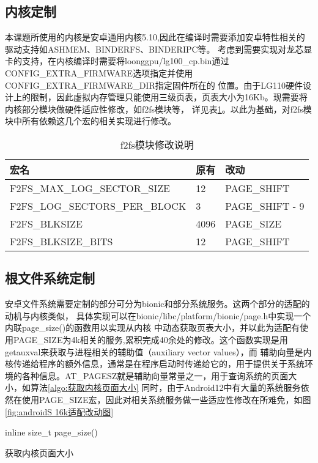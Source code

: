 \subsection{内核定制}
本课题所使用的内核是安卓通用内核5.10,因此在编译时需要添加安卓特性相关的驱动支持如ASHMEM、BINDERFS、BINDERIPC等。
考虑到需要实现对龙芯显卡的支持，在内核编译时需要将loonggpu/lg100\_cp.bin通过CONFIG\_EXTRA\_FIRMWARE选项指定并使用CONFIG\_EXTRA\_FIRMWARE\_DIR指定固件所在的
位置。由于LG110硬件设计上的限制，因此虚拟内存管理只能使用三级页表，页表大小为16Kb。现需要将内核部分模块做硬件适应性修改，如f2fs模块等，
详见表\ref{tab:f2fs模块修改说明}。以此为基础，对f2fs模块中所有依赖这几个宏的相关实现进行修改。

\begin{table}[h]
  \centering
  \caption{f2fs模块修改说明}
  \label{tab:f2fs模块修改说明}
  \begin{tabular}{lll}
    \toprule
    宏名   &   原有  &改动  \\
    \midrule
    F2FS\_MAX\_LOG\_SECTOR\_SIZE & 12 & PAGE\_SHIFT \\
    F2FS\_LOG\_SECTORS\_PER\_BLOCK & 3 & PAGE\_SHIFT - 9 \\
    F2FS\_BLKSIZE & 4096 & PAGE\_SIZE \\
    F2FS\_BLKSIZE\_BITS & 12 & PAGE\_SHIFT \\
    \bottomrule
  \end{tabular}
  \note{}
\end{table}

\subsection{根文件系统定制}
安卓文件系统需要定制的部分可分为bionic和部分系统服务。这两个部分的适配的动机与内核类似，
具体实现可以在bionic/libc/platform/bionic/page.h中实现一个内联page\_size()的函数用以实现从内核
中动态获取页表大小，并以此为适配有使用PAGE\_SIZE为4k相关的服务,累积完成40余处的修改。这个函数实现是用getauxval来获取与进程相关的辅助值（auxiliary vector values），而
辅助向量是内核传递给程序的额外信息，通常是在程序启动时传递给它的，用于提供关于系统环境的各种信息。AT\_PAGESZ就是辅助向量常量之一，用于查询系统的页面大小，如算法\ref{algo:获取内核页面大小}
同时，由于Android12中有大量的系统服务依然在使用PAGE\_SIZE宏，因此对相关系统服务做一些适应性修改在所难免，如图\ref{fig:androidS 16k适配改动图}
\begin{algorithm}
  \SetAlgoLined
  inline size\_t page\_size(){\\
  }
  \caption{获取内核页面大小}
  \label{algo:获取内核页面大小}
\end{algorithm}

